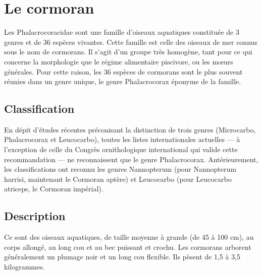 \documentclass[12pt]{article}
\begin{document}


\section*{Le cormoran}
Les Phalacrocoracidae sont une famille d'oiseaux aquatiques constituée de 3 genres et de 36 espèces vivantes. Cette famille est celle des oiseaux de mer connus sous le nom de cormorans. Il s'agit d'un groupe très homogène, tant pour ce qui concerne la morphologie que le régime alimentaire piscivore, ou les mœurs générales. Pour cette raison, les 36 espèces de cormorans sont le plus souvent réunies dans un genre unique, le genre Phalacrocorax éponyme de la famille.

\subsection*{Classification}

En dépit d'études récentes préconisant la distinction de trois genres (Microcarbo, Phalacrocorax et Leucocarbo), toutes les listes internationales actuelles — à l'exception de celle du Congrès ornithologique international qui valide cette recommandation — ne reconnaissent que le genre Phalacrocorax. Antérieurement, les classifications ont reconnu les genres Nannopterum (pour Nannopterum harrisi, maintenant le Cormoran aptère) et Leucocarbo (pour Leucocarbo atriceps, le Cormoran impérial).

\subsection*{Description}

Ce sont des oiseaux aquatiques, de taille moyenne à grande (de 45 à 100 cm), au corps allongé, au long cou et au bec puissant et crochu. Les cormorans arborent généralement un plumage noir et un long cou flexible. Ils pèsent de 1,5 à 3,5 kilogrammes.
\end{document}
